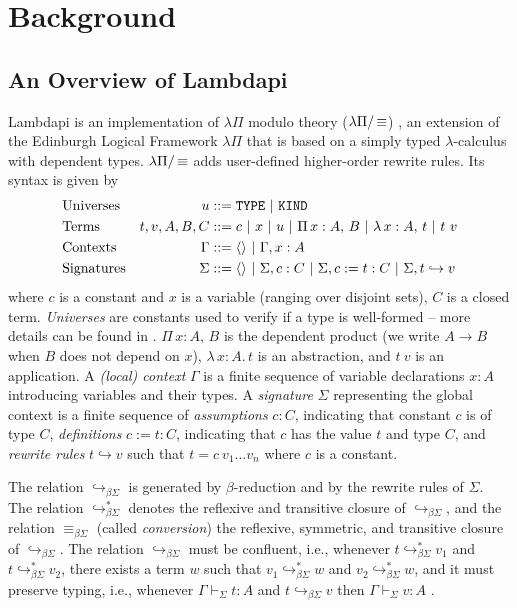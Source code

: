 \section{Background}
\label{sec:background}

\subsection{An Overview of Lambdapi}
\label{ssect:lambdapi-overview}

Lambdapi is an implementation of $\lambda\Pi$ modulo theory ($\lpm$) \cite{lambdapi}, an extension of the Edinburgh Logical Framework $\lambda\Pi$ \cite{lf} that is based on a simply typed $\lambda$-calculus with dependent types. $\lpm$ adds user-defined higher-order rewrite rules. Its syntax is given by
%
\begin{align*}
&\text{Universes}  &u &::= \tt{TYPE} ~|~ \tt{KIND} \\
&\text{Terms}   &t,v, A,B,C &::= c ~|~ x ~|~ u ~|~ \Pi\,x : A,\,B~|~ \lambda\,x : A,\,t ~|~t~v \\
&\text{Contexts}   &\Gamma &::= \langle \rangle ~|~ \Gamma, x : A \\
&\text{Signatures}  &\Sigma &::= \langle \rangle ~|~ \Sigma, c : C ~|~ \Sigma, c := t : C ~|~ \Sigma, t \hookrightarrow v 
\end{align*}
%
where $c$ is a constant and $x$ is a variable  (ranging over disjoint sets), $C$ is a closed term. \emph{Universes} are constants used to verify if a type is well-formed -- more details can be found in \cite[\S 2.1]{lf}. $\Pi\,x : A,\,B$ is the dependent product (we write $A \rightarrow B$ when $B$ does not depend on $x$), $\lambda\,x : A.\,t$ is an abstraction, and  $t~v$ is an application. A \emph{(local) context} $\Gamma$ is a finite sequence of variable declarations $x:A$ introducing variables and their types.
A \emph{signature} $\Sigma$ representing the global context is a finite sequence of \emph{assumptions} $c : C$, indicating that constant $c$ is of type $C$, \emph{definitions} $c := t : C$, indicating that $c$ has the value $t$ and type $C$, and \emph{rewrite rules} $t \hookrightarrow v$ such that $t = c~v_1 \dots v_n$ where $c$ is a constant.

The relation $\hookrightarrow_{\beta\Sigma}$ is generated by $\beta$-reduction and by the rewrite rules of $\Sigma$. The relation $\hookrightarrow_{\beta\Sigma}^*$ denotes the reflexive and transitive closure of $\hookrightarrow_{\beta\Sigma}$, and the relation $\equiv_{\beta\Sigma}$ (called \emph{conversion}) the reflexive, symmetric, and transitive closure of $\hookrightarrow_{\beta\Sigma}$. 
The relation $\hookrightarrow_{\beta\Sigma}$ must be confluent, i.e.,
whenever $t \hookrightarrow_{\beta\Sigma}^* v_1$ and $t \hookrightarrow_{\beta\Sigma}^* v_2$, there exists a term $w$ such that $v_1 \hookrightarrow_{\beta\Sigma}^* w$ and $v_2 \hookrightarrow_{\beta\Sigma}^* w$, and it must preserve typing, i.e., 
whenever $\Gamma \vdash_\Sigma t: A$ and $t \hookrightarrow_{\beta\Sigma} v$ then $\Gamma \vdash_\Sigma v: A$ \cite{blanqui:LIPIcs.FSCD.2020.13}.


